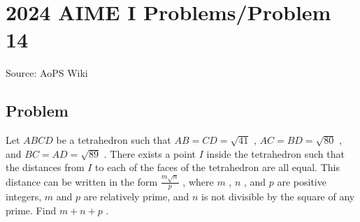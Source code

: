 \documentclass[12pt]{article}
\begin{document}
\section*{{2024 AIME I Problems/Problem 14}}
Source: AoPS Wiki

\subsection*{Problem}
Let $ABCD$ be a tetrahedron such that $AB=CD= \sqrt{41}$ , $AC=BD= \sqrt{80}$ , and $BC=AD= \sqrt{89}$ . There exists a point $I$ inside the tetrahedron such that the distances from $I$ to each of the faces of the tetrahedron are all equal. This distance can be written in the form $\frac{m \sqrt n}{p}$ , where $m$ , $n$ , and $p$ are positive integers, $m$ and $p$ are relatively prime, and $n$ is not divisible by the square of any prime. Find $m+n+p$ .
\end{document}

